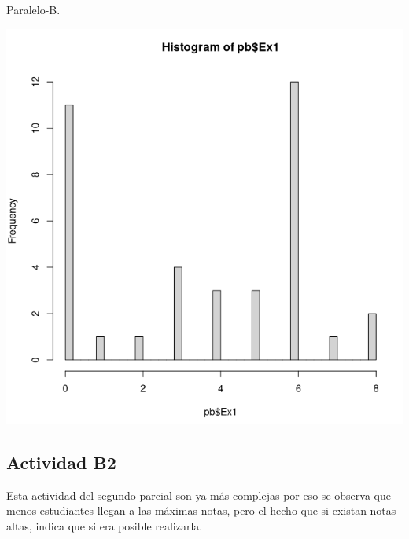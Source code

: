 \documentclass[a4pa<per,12pt,spanish]{article}
\begin{document}
\begin{minipage}[h]{0.45\linewidth}
Paralelo-B.

\includegraphics[scale=0.3]{images/histo-PB-Ex1.png}
\end{minipage}





\subsection{Actividad B2}
\label{sec:actividad-b2}
Esta actividad del segundo parcial son ya más complejas por eso se observa que menos estudiantes llegan a las máximas notas, pero el hecho que si existan notas altas, indica que si era posible realizarla.\\
\end{document}
